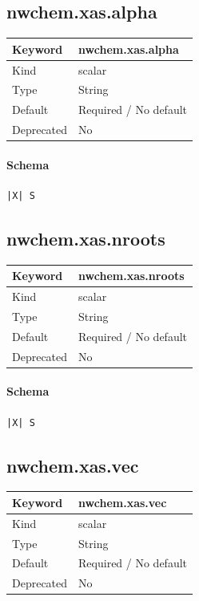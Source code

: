 \documentclass[11pt]{article}
\begin{document}
\subsection{nwchem.xas.alpha}
\label{kw:nwchem-xas-alpha}
\begin{longtable}{|p{1.5in}|p{4.5in}|}
\hline
Keyword & nwchem.xas.alpha \\
\hline
Kind & scalar \\
\hline
Type & String \\
\hline
Default & Required / No default \\
\hline
Deprecated & No \\
\hline
\end{longtable}
\paragraph{Schema}
\begin{Verbatim}
|X| S
\end{Verbatim}

\subsection{nwchem.xas.nroots}
\label{kw:nwchem-xas-nroots}
\begin{longtable}{|p{1.5in}|p{4.5in}|}
\hline
Keyword & nwchem.xas.nroots \\
\hline
Kind & scalar \\
\hline
Type & String \\
\hline
Default & Required / No default \\
\hline
Deprecated & No \\
\hline
\end{longtable}
\paragraph{Schema}
\begin{Verbatim}
|X| S
\end{Verbatim}

\subsection{nwchem.xas.vec}
\label{kw:nwchem-xas-vec}
\begin{longtable}{|p{1.5in}|p{4.5in}|}
\hline
Keyword & nwchem.xas.vec \\
\hline
Kind & scalar \\
\hline
Type & String \\
\hline
Default & Required / No default \\
\hline
Deprecated & No \\
\hline
\end{longtable}
\end{document}
